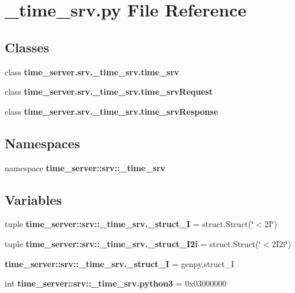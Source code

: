 \section{\-\_\-time\-\_\-srv.\-py \-File \-Reference}
\label{__time__srv_8py}
\subsection*{\-Classes}
\begin{DoxyCompactItemize}
\item 
class {\bf time\-\_\-server.\-srv.\-\_\-time\-\_\-srv.\-time\-\_\-srv}
\item 
class {\bf time\-\_\-server.\-srv.\-\_\-time\-\_\-srv.\-time\-\_\-srv\-Request}
\item 
class {\bf time\-\_\-server.\-srv.\-\_\-time\-\_\-srv.\-time\-\_\-srv\-Response}
\end{DoxyCompactItemize}
\subsection*{\-Namespaces}
\begin{DoxyCompactItemize}
\item 
namespace {\bf time\-\_\-server\-::srv\-::\-\_\-time\-\_\-srv}
\end{DoxyCompactItemize}
\subsection*{\-Variables}
\begin{DoxyCompactItemize}
\item 
tuple {\bf time\-\_\-server\-::srv\-::\-\_\-time\-\_\-srv.\-\_\-struct\-\_\-I} = struct.\-Struct(\char`\"{}$<$2\-I\char`\"{})
\item 
tuple {\bf time\-\_\-server\-::srv\-::\-\_\-time\-\_\-srv.\-\_\-struct\-\_\-I2i} = struct.\-Struct(\char`\"{}$<$2\-I2i\char`\"{})
\item 
{\bf time\-\_\-server\-::srv\-::\-\_\-time\-\_\-srv.\-\_\-struct\-\_\-\-I} = genpy.\-struct\-\_\-\-I
\item 
int {\bf time\-\_\-server\-::srv\-::\-\_\-time\-\_\-srv.\-python3} = 0x03000000
\end{DoxyCompactItemize}
